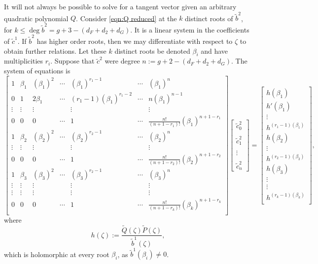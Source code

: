 It will not always be possible to solve for a tangent vector given an arbitrary quadratic polynomial $Q$. Consider \eqref{eqn:Q reduced} at the $k$ distinct roots of $\tilde{b}^2$, for $k \leq \deg \tilde{b}^2 = g + 3 - (d_F + d_2 + d_G)$. It is a linear system in the coefficients of $\tilde{c}^1$. If $\tilde{b}^2$ has higher order roots, then we may differentiate with respect to $ζ$ to obtain further relations. Let these $k$ distinct roots be denoted $β_i$ and have multiplicities $r_i$. Suppose that $\tilde{c}^2$ were degree $n := g + 2 - (d_F + d_2 + d_G)$. The system of equations is
\[
\begin{bmatrix}
1 & β_1 & (β_1)^2 & \cdots & (β_1)^{r_1-1} & \cdots & (β_1)^{n} \\
0 & 1 & 2β_1 & \cdots & (r_1-1)(β_1)^{r_1-2} & \cdots & n(β_1)^{n-1} \\
\vdots & \vdots & \vdots & & \vdots & & \vdots \\
0 & 0 & 0 & \cdots & 1 & \cdots & \frac{n!}{(n+1 - r_1)!}(β_1)^{n+1-r_1} \\
1 & β_2 & (β_2)^2 & \cdots & (β_2)^{r_2-1} & \cdots & (β_2)^{n} \\
\vdots & \vdots & \vdots & & \vdots & & \vdots \\
0 & 0 & 0 & \cdots & 1 & \cdots & \frac{n!}{(n+1 - r_2)!}(β_2)^{n+1-r_2} \\
1 & β_3 & (β_3)^2 & \cdots & (β_3)^{r_2-1} & \cdots & (β_3)^{n} \\
\vdots & \vdots & \vdots & & \vdots & & \vdots \\
\vdots & \vdots & \vdots & & \vdots & & \vdots \\
0 & 0 & 0 & \cdots & 1 & \cdots & \frac{n!}{(n+1 - r_k)!}(β_k)^{n+1-r_k} \\
\end{bmatrix}
\begin{bmatrix}
\tilde{c}^2_0 \\~\\ \tilde{c}^2_1 \\~\\ \vdots \\~\\ \tilde{c}^2_n
\end{bmatrix}
=
\begin{bmatrix}
h(β_1) \\ h'(β_1) \\ \vdots \\ h^{(r_1-1)(β_1)} \\
h(β_2) \\ \vdots \\ h^{(r_2-1)(β_2)} \\
h(β_3) \\ \vdots \\ \vdots \\ h^{(r_k-1)(β_k)} \\
\end{bmatrix},
\]
where
\[
h(ζ) := \frac{\tilde{Q}(ζ)\tilde{P}(ζ)}{\tilde{b}^1(ζ)},
\]
which is holomorphic at every root $β_i$, as $\tilde{b}^1(β_i)\neq 0$.

